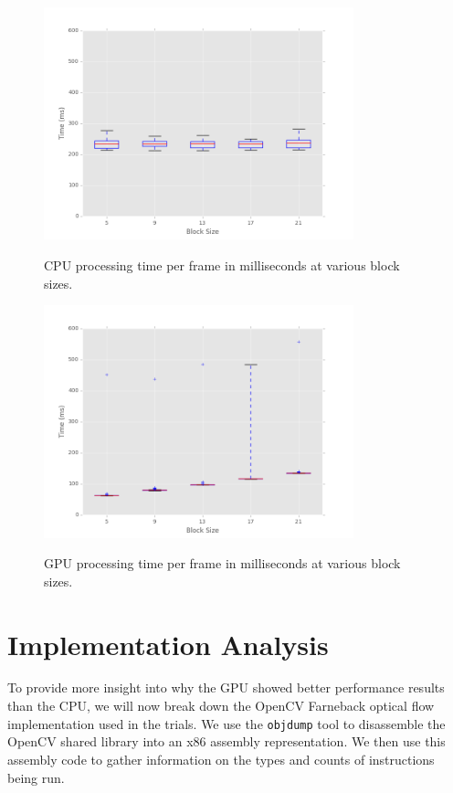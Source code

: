 \documentclass[12pt,letterpaper]{article}
\begin{document}
\begin{figure}[H]
  \centering
    \includegraphics[width=0.8\textwidth]{img/cpu_blocksize.png}
  \label{fig:cpublock}
  \caption{CPU processing time per frame in milliseconds at various block sizes.}
\end{figure}

\begin{figure}[H]
  \centering
    \includegraphics[width=0.8\textwidth]{img/gpu_blocksize.png}
  \label{fig:gpublock}
  \caption{GPU processing time per frame in milliseconds at various block sizes.}
\end{figure}

\section{Implementation Analysis}
To provide more insight into why the GPU showed better performance results than
the CPU, we will now break down the OpenCV Farneback optical flow implementation
used in the trials. We use the \texttt{objdump} tool to disassemble the OpenCV
shared library into an x86 assembly representation. We then use this assembly
code to gather information on the types and counts of instructions being run.
\end{document}
